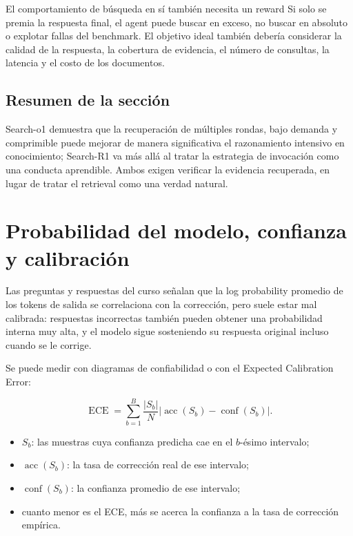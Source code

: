 \documentclass[a4paper]{article}
\begin{document}
\begin{importantbox}{El comportamiento de búsqueda en sí también necesita un reward}
Si solo se premia la respuesta final, el agent puede buscar en exceso, no buscar en absoluto o explotar fallas del benchmark. El objetivo ideal también debería considerar la calidad de la respuesta, la cobertura de evidencia, el número de consultas, la latencia y el costo de los documentos.
\end{importantbox}

\subsection{Resumen de la sección}

Search-o1 demuestra que la recuperación de múltiples rondas, bajo demanda y comprimible puede mejorar de manera significativa el razonamiento intensivo en conocimiento; Search-R1 va más allá al tratar la estrategia de invocación como una conducta aprendible. Ambos exigen verificar la evidencia recuperada, en lugar de tratar el retrieval como una verdad natural.

\section{Probabilidad del modelo, confianza y calibración}

Las preguntas y respuestas del curso señalan que la log probability promedio de los tokens de salida se correlaciona con la corrección, pero suele estar mal calibrada: respuestas incorrectas también pueden obtener una probabilidad interna muy alta, y el modelo sigue sosteniendo su respuesta original incluso cuando se le corrige.

Se puede medir con diagramas de confiabilidad o con el Expected Calibration Error:

$$
\operatorname{ECE}=\sum_{b=1}^{B}\frac{|S_b|}{N}
\left|\operatorname{acc}(S_b)-\operatorname{conf}(S_b)\right|.
$$

\begin{itemize}
    \item $S_b$: las muestras cuya confianza predicha cae en el $b$-ésimo intervalo;
    \item $\operatorname{acc}(S_b)$: la tasa de corrección real de ese intervalo;
    \item $\operatorname{conf}(S_b)$: la confianza promedio de ese intervalo;
    \item cuanto menor es el ECE, más se acerca la confianza a la tasa de corrección empírica.
\end{itemize}
\end{document}
